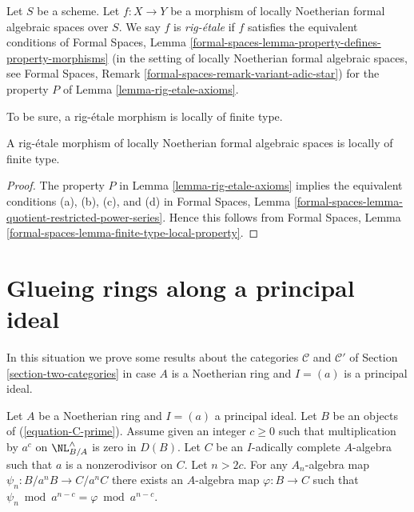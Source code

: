 \begin{definition}
\label{definition-rig-etale}
Let $S$ be a scheme. Let $f : X \to Y$ be a morphism of locally
Noetherian formal algebraic spaces over $S$. We say $f$ is
{\it rig-\'etale} if $f$ satisfies the equivalent conditions of
Formal Spaces, Lemma
\ref{formal-spaces-lemma-property-defines-property-morphisms}
(in the setting of locally Noetherian formal algebraic spaces, see
Formal Spaces, Remark \ref{formal-spaces-remark-variant-adic-star})
for the property $P$ of Lemma \ref{lemma-rig-etale-axioms}.
\end{definition}

\noindent
To be sure, a rig-\'etale morphism is locally of finite type.

\begin{lemma}
\label{lemma-rig-etale-finite-type}
A rig-\'etale morphism of locally Noetherian formal algebraic spaces
is locally of finite type.
\end{lemma}

\begin{proof}
The property $P$ in Lemma \ref{lemma-rig-etale-axioms}
implies the equivalent conditions (a), (b), (c), and (d) in
Formal Spaces, Lemma
\ref{formal-spaces-lemma-quotient-restricted-power-series}.
Hence this follows from
Formal Spaces, Lemma \ref{formal-spaces-lemma-finite-type-local-property}.
\end{proof}








\section{Glueing rings along a principal ideal}
\label{section-approximation-principal}

\noindent
In this situation we prove some results about the categories
$\mathcal{C}$ and $\mathcal{C}'$ of
Section \ref{section-two-categories}
in case $A$ is a Noetherian ring and $I = (a)$ is a principal
ideal.

\begin{lemma}
\label{lemma-get-morphism-nonzerodivisor}
Let $A$ be a Noetherian ring and $I = (a)$ a principal ideal.
Let $B$ be an objects of (\ref{equation-C-prime}).
Assume given an integer $c \geq 0$ such that
multiplication by $a^c$ on $\NL^\wedge_{B/A}$ is zero in $D(B)$.
Let $C$ be an $I$-adically complete $A$-algebra such that
$a$ is a nonzerodivisor on $C$. Let $n > 2c$. For any $A_n$-algebra
map $\psi_n : B/a^nB \to C/a^nC$ there exists an $A$-algebra
map $\varphi : B \to C$ such that
$\psi_n \bmod a^{n - c} = \varphi \bmod a^{n - c}$.
\end{lemma}

